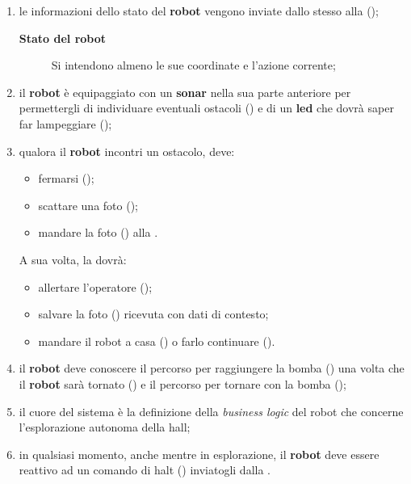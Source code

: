 \begin{enumerate}
  \item
    le informazioni dello stato del \textbf{robot } vengono inviate dallo stesso alla \textbf{} ();
    \begin{description}
      \item[\textbf{Stato del robot}] Si intendono almeno le sue coordinate e l'azione corrente;
    \end{description}

  \item
    il \textbf{robot } è equipaggiato con un \textbf{sonar} nella sua parte anteriore per permettergli di individuare eventuali ostacoli () e di un \textbf{led} che dovrà saper far lampeggiare ();

  \item
    qualora il \textbf{robot } incontri un ostacolo, deve:
    \begin{itemize}
      \item fermarsi ();
      \item scattare una foto ();
      \item mandare la foto () alla \textbf{}.
    \end{itemize}
    A sua volta, la \textbf{} dovrà:
    \begin{itemize}
      \item allertare l'operatore ();
      \item salvare la foto () ricevuta con dati di contesto;
      \item mandare il robot a casa () o farlo continuare ().
    \end{itemize}

  \item
    il \textbf{robot } deve conoscere il percorso per raggiungere la bomba () una volta che il \textbf{robot } sarà tornato () e il percorso per tornare con la bomba ();

  \item
    il cuore del sistema è la definizione della \textit{business logic} del robot che concerne l'esplorazione autonoma della hall;

  \item
    in qualsiasi momento, anche mentre in esplorazione, il \textbf{robot } deve essere reattivo ad un comando di halt () inviatogli dalla \textbf{}.
\end{enumerate}

